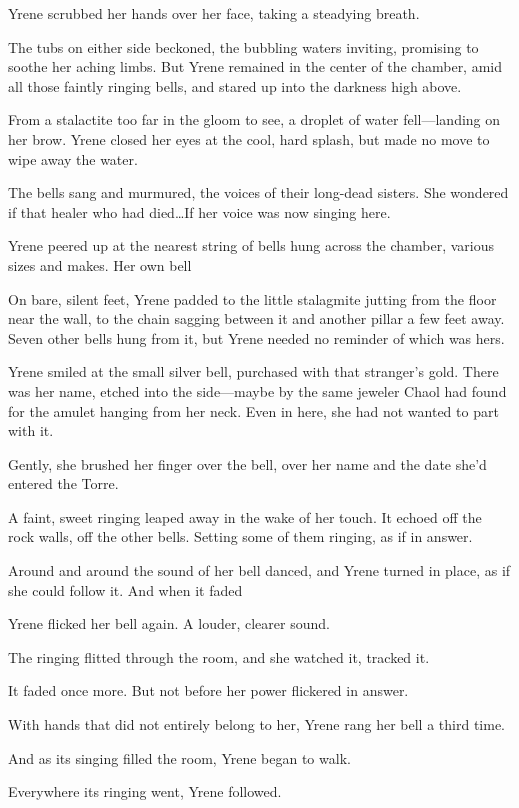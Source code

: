 Yrene scrubbed her hands over her face, taking a steadying breath.

The tubs on either side beckoned, the bubbling waters inviting, promising to soothe her aching limbs.
But Yrene remained in the center of the chamber, amid all those faintly ringing bells, and stared up into the darkness high above.

From a stalactite too far in the gloom to see, a droplet of water fell---landing on her brow.
Yrene closed her eyes at the cool, hard splash, but made no move to wipe away the water.

The bells sang and murmured, the voices of their long-dead sisters.
She wondered if that healer who had died\ldots If her voice was now singing here.

Yrene peered up at the nearest string of bells hung across the chamber, various sizes and makes.
Her own bell 

On bare, silent feet, Yrene padded to the little stalagmite jutting from the floor near the wall, to the chain sagging between it and another pillar a few feet away.
Seven other bells hung from it, but Yrene needed no reminder of which was hers.

Yrene smiled at the small silver bell, purchased with that stranger's gold.
There was her name, etched into the side---maybe by the same jeweler Chaol had found for the amulet hanging from her neck.
Even in here, she had not wanted to part with it.

Gently, she brushed her finger over the bell, over her name and the date she'd entered the Torre.

A faint, sweet ringing leaped away in the wake of her touch.
It echoed off the rock walls, off the other bells.
Setting some of them ringing, as if in answer.

Around and around the sound of her bell danced, and Yrene turned in place, as if she could follow it.
And when it faded 

Yrene flicked her bell again.
A louder, clearer sound.

The ringing flitted through the room, and she watched it, tracked it.

It faded once more.
But not before her power flickered in answer.

With hands that did not entirely belong to her, Yrene rang her bell a third time.

And as its singing filled the room, Yrene began to walk.

Everywhere its ringing went, Yrene followed.

